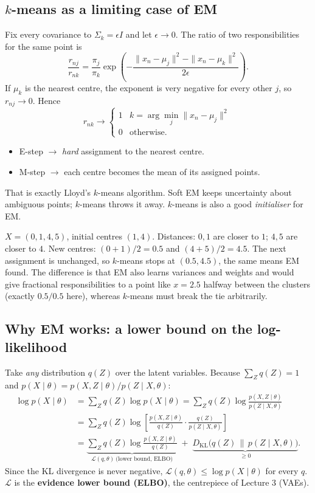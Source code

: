 \documentclass[11pt,a4paper]{article}
\newcommand{\KL}{D_{\mathrm{KL}}}
\newcommand{\Lb}{\mathcal{L}}
\begin{document}
\subsection{\texorpdfstring{$k$}{k}-means as a limiting case of EM}

Fix every covariance to $\Sigma_k=\epsilon I$ and let $\epsilon\to0$. The ratio of two responsibilities for the same point is
\[
\frac{r_{nj}}{r_{nk}}=\frac{\pi_j}{\pi_k}\exp\!\left(-\frac{\|x_n-\mu_j\|^2-\|x_n-\mu_k\|^2}{2\epsilon}\right).
\]
If $\mu_k$ is the nearest centre, the exponent is very negative for every other $j$, so $r_{nj}\to0$. Hence
\[
r_{nk}\to\begin{cases}1 & k=\arg\min_j\|x_n-\mu_j\|^2\\ 0&\text{otherwise.}\end{cases}
\]
\begin{itemize}[nosep]
\item E-step $\to$ \emph{hard} assignment to the nearest centre.
\item M-step $\to$ each centre becomes the mean of its assigned points.
\end{itemize}
That is exactly Lloyd's $k$-means algorithm. Soft EM keeps uncertainty about ambiguous points; $k$-means throws it away. $k$-means is also a good \emph{initialiser} for EM.

\begin{example}
$X=(0,1,4,5)$, initial centres $(1,4)$. Distances: $0,1$ are closer to $1$; $4,5$ are closer to $4$. New centres: $(0+1)/2=0.5$ and $(4+5)/2=4.5$. The next assignment is unchanged, so $k$-means stops at $(0.5,4.5)$, the same means EM found. The difference is that EM also learns variances and weights and would give fractional responsibilities to a point like $x=2.5$ halfway between the clusters (exactly $0.5/0.5$ here), whereas $k$-means must break the tie arbitrarily.
\end{example}

\subsection{Why EM works: a lower bound on the log-likelihood}\label{sec:whyem}

Take \emph{any} distribution $q(Z)$ over the latent variables. Because $\sum_Z q(Z)=1$ and $p(X\mid\theta)=p(X,Z\mid\theta)/p(Z\mid X,\theta)$:
\begin{align*}
\log p(X\mid\theta)
&=\sum_Z q(Z)\log p(X\mid\theta)
=\sum_Z q(Z)\log\frac{p(X,Z\mid\theta)}{p(Z\mid X,\theta)}\\
&=\sum_Z q(Z)\log\left[\frac{p(X,Z\mid\theta)}{q(Z)}\cdot\frac{q(Z)}{p(Z\mid X,\theta)}\right]\\
&=\underbrace{\sum_Z q(Z)\log\frac{p(X,Z\mid\theta)}{q(Z)}}_{\Lb(q,\theta)\ \text{(lower bound, ELBO)}}
\;+\;\underbrace{\KL\big(q(Z)\,\|\,p(Z\mid X,\theta)\big)}_{\ge0}.
\end{align*}
Since the KL divergence is never negative, $\Lb(q,\theta)\le\log p(X\mid\theta)$ for every $q$. $\Lb$ is the \textbf{evidence lower bound (ELBO)}, the centrepiece of Lecture 3 (VAEs).
\end{document}
